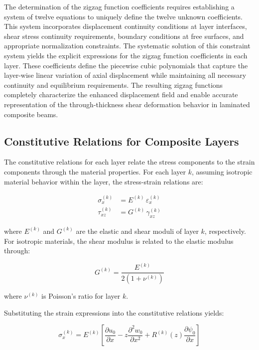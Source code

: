 \documentclass[12pt,a4paper]{report}
\begin{document}
The determination of the zigzag function coefficients requires establishing a system of twelve equations to uniquely define the twelve unknown coefficients. This system incorporates displacement continuity conditions at layer interfaces, shear stress continuity requirements, boundary conditions at free surfaces, and appropriate normalization constraints.
The systematic solution of this constraint system yields the explicit expressions for the zigzag function coefficients in each layer. These coefficients define the piecewise cubic polynomials that capture the layer-wise linear variation of axial displacement while maintaining all necessary continuity and equilibrium requirements. The resulting zigzag functions completely characterize the enhanced displacement field and enable accurate representation of the through-thickness shear deformation behavior in laminated composite beams.



\subsection{Constitutive Relations for Composite Layers}

The constitutive relations for each layer relate the stress components to the strain components through the material properties. For each layer $k$, assuming isotropic material behavior within the layer, the stress-strain relations are:

\begin{align}
\sigma_x^{(k)} &= E^{(k)} \, \varepsilon_x^{(k)} \\
\tau_{xz}^{(k)} &= G^{(k)} \, \gamma_{xz}^{(k)}
\end{align}



where $E^{(k)}$ and $G^{(k)}$ are the elastic and shear moduli of layer $k$, respectively. For isotropic materials, the shear modulus is related to the elastic modulus through:

\begin{equation}
G^{(k)} = \frac{E^{(k)}}{2 \left( 1 + \nu^{(k)} \right)}
\end{equation}


where $\nu^{(k)}$ is Poisson's ratio for layer $k$.

Substituting the strain expressions into the constitutive relations yields:

\begin{equation}
\sigma_x^{(k)} = E^{(k)} \left[ 
\frac{\partial u_0}{\partial x} 
- z \frac{\partial^2 w_0}{\partial x^2} 
+ R^{(k)}(z) \frac{\partial \psi_0}{\partial x} 
\right]
\end{equation}
\end{document}
